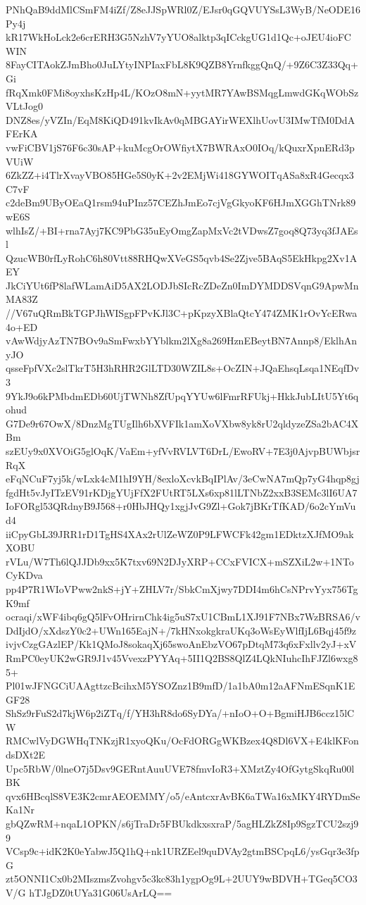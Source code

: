 PNhQaB9ddMlCSmFM4iZf/Z8eJJSpWRl0Z/EJsr0qGQVUYSsL3WyB/NeODE16Py4j
kR17WkHoLck2e6crERH3G5NzhV7yYUO8alktp3qICckgUG1d1Qc+oJEU4ioFCWIN
8FayCITAokZJmBho0JuLYtyINPIaxFbL8K9QZB8YrnfkggQnQ/+9Z6C3Z33Qq+Gi
fRqXmk0FMi8oyxhsKzHp4L/KOzO8mN+yytMR7YAwBSMqgLmwdGKqWObSzVLtJog0
DNZ8es/yVZIn/EqM8KiQD491kvIkAv0qMBGAYirWEXlhUovU3IMwTfM0DdAFErKA
vwFiCBV1jS76F6c30sAP+kuMcgOrOWfiytX7BWRAxO0IOq/kQuxrXpnERd3pVUiW
6ZkZZ+i4TlrXvayVBO85HGe5S0yK+2v2EMjWi418GYWOITqASa8xR4Gecqx3C7vF
c2deBm9UByOEaQ1rsm94uPInz57CEZhJmEo7cjVgGkyoKF6HJmXGGhTNrk89wE6S
wlhIsZ/+BI+rna7Ayj7KC9PbG35uEyOmgZapMxVc2tVDwsZ7goq8Q73yq3fJAEsl
QzucWB0rfLyRohC6h80Vtt88RHQwXVeGS5qvb4Se2Zjve5BAqS5EkHkpg2Xv1AEY
JkCiYUt6fP8lafWLamAiD5AX2LODJbSIcRcZDeZn0ImDYMDDSVqnG9ApwMnMA83Z
//V67uQRmBkTGPJhWISgpFPvKJl3C+pKpzyXBlaQtcY474ZMK1rOvYcERwa4o+ED
vAwWdjyAzTN7BOv9aSmFwxbYYblkm2lXg8a269HznEBeytBN7Annp8/EklhAnyJO
qsseFpfVXc2slTkrT5H3hRHR2GlLTD30WZIL8s+OcZIN+JQaEhsqLsqa1NEqfDv3
9YkJ9o6kPMbdmEDb60UjTWNh8ZfUpqYYUw6lFmrRFUkj+HkkJubLItU5Yt6qohud
G7De9r67OwX/8DnzMgTUgIlh6bXVFIk1amXoVXbw8yk8rU2qldyzeZSa2bAC4XBm
szEUy9x0XVOiG5glOqK/VaEm+yfVvRVLVT6DrL/EwoRV+7E3j0AjvpBUWbjsrRqX
eFqNCuF7yj5k/wLxk4cM1hI9YH/8exloXcvkBqIPlAv/3eCwNA7mQp7yG4hqp8gj
fgdHt5vJyITzEV91rKDjgYUjFfX2FUtRT5LXs6xp81lLTNbZ2xxB3SEMc3lI6UA7
IoFORgl53QRdnyB9J568+r0HbJHQy1xgjJvG9Zl+Gok7jBKrTfKAD/6o2cYmVud4
iiCpyGbL39JRR1rD1TgHS4XAx2rUlZeWZ0P9LFWCFk42gm1EDktzXJfMO9akXOBU
rVLu/W7Th6lQJJDb9xx5K7txv69N2DJyXRP+CCxFVICX+mSZXiL2w+1NToCyKDva
pp4P7R1WIoVPww2nkS+jY+ZHLV7r/SbkCmXjwy7DDI4m6hCsNPrvYyx756TgK9mf
ocraqi/xWF4ibq6gQ5lFvOHrirnChk4ig5uS7xU1CBmL1XJ91F7NBx7WzBRSA6/v
DdIjdO/xXdszY0c2+UWn165EajN+/7kHNxokgkraUKq3oWsEyWlfIjL6Bqj45f9z
ivjvCzgGAzlEP/Kk1QMoJ8sokaqXj65swoAnEbzVO67pDtqM73q6xFxllv2yJ+xV
RmPC0eyUK2wGR9J1v45VvexzPYYAq+5II1Q2BS8QlZ4LQkNIuhcIhFJZl6wxg85+
Pl01wJFNGCiUAAgttzcBcihxM5YSOZnz1B9mfD/1a1bA0m12aAFNmESqnK1EGF28
ShSz9rFuS2d7kjW6p2iZTq/f/YH3hR8do6SyDYa/+nIoO+O+BgmiHJB6ccz15lCW
RMCwlVyDGWHqTNKzjR1xyoQKu/OcFdORGgWKBzex4Q8Dl6VX+E4klKFondsDXt2E
Upc5RbW/0lneO7j5Dsv9GERntAuuUVE78fmvIoR3+XMztZy4OfGytgSkqRu00lBK
qvx6HBcqlS8VE3K2cmrAEOEMMY/o5/eAntcxrAvBK6aTWa16xMKY4RYDmSeKa1Nr
gbQZwRM+nqaL1OPKN/s6jTraDr5FBUkdkxsxraP/5agHLZkZ8Ip9SgzTCU2szj99
VCsp9c+idK2K0eYabwJ5Q1hQ+nk1URZEel9quDVAy2gtmBSCpqL6/ysGqr3e3fpG
zt5ONNI1Cx0b2MIszmsZvohgv5c3kc83h1ygpOg9L+2UUY9wBDVH+TGeq5CO3V/G
hTJgDZ0tUYa31G06UsArLQ==
